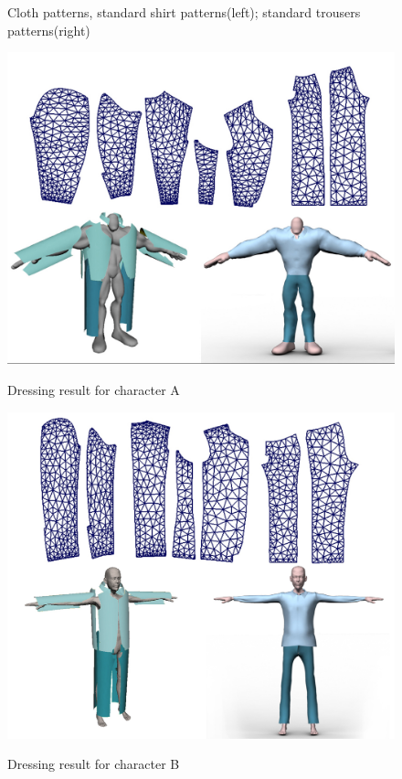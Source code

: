 \begin{figure}[H]
\begin{subfigure}[b]{0.3\textwidth}
                \caption{}
                \label{fig:subjectB}
        \end{subfigure}
        \caption{Cloth patterns, standard shirt patterns(left); standard trousers patterns(right)}\label{fig:patterns}
\end{figure}

\begin{figure}[H]
	\centering
	\includegraphics[width=0.9\columnwidth]{../images/resultA}\\
    \caption{Dressing result for character A}
    \label{figure:character_A_pattern}
\end{figure}


\begin{figure}[H]
	\centering
	\includegraphics[width=0.9\columnwidth]{../images/resultB}\\
    \caption{Dressing result for character B}
    \label{figure:character_B_pattern}
\end{figure}


